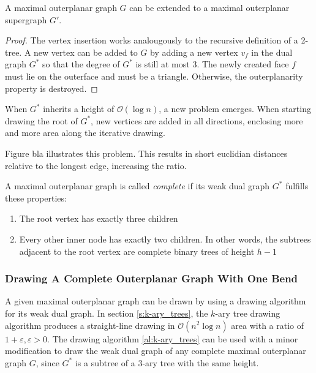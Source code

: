 \begin{observation}
\end{observation}

\begin{lemma}
	A maximal outerplanar graph $G$ can be extended to a maximal outerplanar supergraph $G'$.\label{l:outerplanar-supergraph}
\end{lemma}
\begin{proof}
	The vertex insertion works analougously to the recursive definition of a 2-tree. A new vertex can be added to $G$ by adding a new vertex $v_f$ in the dual graph $G^*$ so that the degree of $G^*$ is still at most 3. The newly created face $f$ must lie on the outerface and must be a triangle. Otherwise, the outerplanarity property is destroyed. 
\end{proof}

When $G^*$ inherits a height of $\mathcal{O}(\log n)$, a new problem emerges. When starting drawing the root of $G^*$, new vertices are added in all directions, enclosing more and more area along the iterative drawing. 
\begin{observation}
	
\end{observation}
Figure bla illustrates this problem. 
This results in short euclidian distances relative to the longest edge, increasing the ratio.\\
\begin{definition}\label{def:complete_maximal_outerplanar}
	A maximal outerplanar graph is called \emph{complete} if its weak dual graph $G^*$ fulfills these properties:
\begin{enumerate}
	\item The root vertex has exactly three children
	\item Every other inner node has exactly two children. In other words, the subtrees adjacent to the root vertex are complete binary trees of height $h-1$
\end{enumerate}
\end{definition}

\subsubsection{Drawing A Complete Outerplanar Graph With One Bend}

A given maximal outerplanar graph can be drawn by using a drawing algorithm for its weak dual graph. In section \ref{s:k-ary_trees}, the $k$-ary tree drawing algorithm produces a straight-line drawing in $\mathcal{O}(n^2 \log n)$ area with a ratio of $1+\varepsilon,\varepsilon>0$. The drawing algorithm \ref{al:k-ary_trees} can be used with a minor modification to draw the weak dual graph of any complete maximal outerplanar graph $G$, since $G^*$ is a subtree of a $3$-ary tree with the same height.\\

